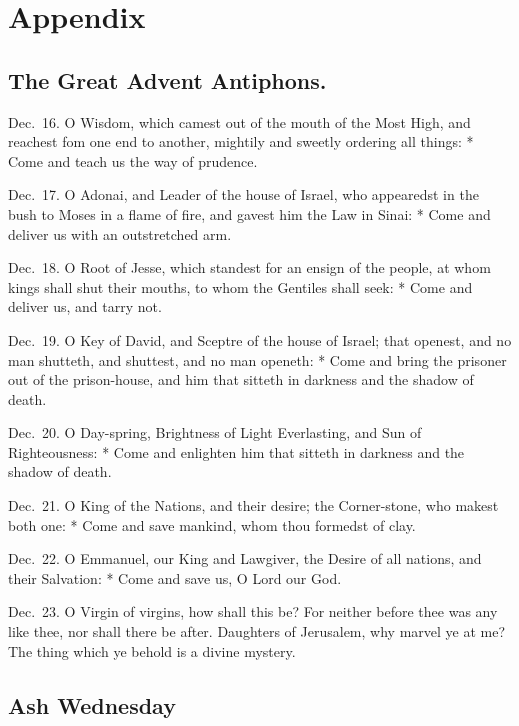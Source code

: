 \chapter{Appendix}
\section{The Great Advent Antiphons.}

Dec.~16.  O Wisdom, which camest out of the mouth of the Most High, and reachest fom one end to another, mightily and sweetly ordering all things: * Come and teach us the way of prudence.

Dec.~17.   O Adonai, and Leader of the house of Israel, who appearedst in the bush to Moses in a flame of fire, and gavest him the Law in Sinai: * Come and deliver us with an outstretched arm.

Dec.~18.  O Root of Jesse, which standest for an ensign of the people, at whom kings shall shut their mouths, to whom the Gentiles shall seek: * Come and deliver us, and tarry not.

Dec.~19.   O Key of David, and Sceptre of the house of Israel; that openest, and no man shutteth, and shuttest, and no man openeth: * Come and bring the prisoner out of the prison-house, and him that sitteth in darkness and the shadow of death.

Dec.~20.    O Day-spring, Brightness of Light Everlasting, and Sun of Righteousness: * Come and enlighten him that sitteth in darkness and the shadow of death.

Dec.~21.    O King of the Nations, and their desire; the Corner-stone, who makest both one: * Come and save mankind, whom thou formedst of clay.

Dec.~22.    O Emmanuel, our King and Lawgiver, the Desire of all nations, and their Salvation: * Come and save us, O Lord our God.

Dec.~23.    O Virgin of virgins, how shall this be?  For neither before thee was any like thee, nor shall there be after.  Daughters of Jerusalem, why marvel ye at me? The thing which ye behold is a divine mystery.

\fleuron
\newpage

\section{Ash Wednesday}
